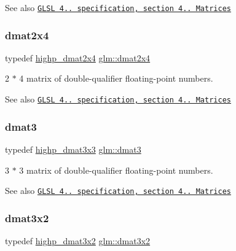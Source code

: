 \begin{DoxySeeAlso}{See also}
\href{http://www.opengl.org/registry/doc/GLSLangSpec.4.20.8.pdf}{\tt G\+L\+SL 4.. specification, section 4.. Matrices} 
\end{DoxySeeAlso}
\mbox{\label{group__core__types_ga2d1dd4b4925d1ea67539902c820483a0}} 
\subsubsection{\texorpdfstring{dmat2x4}{dmat2x4}}
{\footnotesize\ttfamily typedef \mbox{\hyperlink{group__core__precision_gaea7c625705d849f1a55c9bfcb2585875}{highp\+\_\+dmat2x4}} \mbox{\hyperlink{group__core__types_ga2d1dd4b4925d1ea67539902c820483a0}{glm\+::dmat2x4}}}

2 $\ast$ 4 matrix of double-\/qualifier floating-\/point numbers.

\begin{DoxySeeAlso}{See also}
\href{http://www.opengl.org/registry/doc/GLSLangSpec.4.20.8.pdf}{\tt G\+L\+SL 4.. specification, section 4.. Matrices} 
\end{DoxySeeAlso}
\mbox{\label{group__core__types_ga25fd62195c3ef5ac0d32ead1dbfbb929}} 
\subsubsection{\texorpdfstring{dmat3}{dmat3}}
{\footnotesize\ttfamily typedef \mbox{\hyperlink{group__core__precision_gae5f677e4437523476511c84a17206ac2}{highp\+\_\+dmat3x3}} \mbox{\hyperlink{group__core__types_ga25fd62195c3ef5ac0d32ead1dbfbb929}{glm\+::dmat3}}}

3 $\ast$ 3 matrix of double-\/qualifier floating-\/point numbers.

\begin{DoxySeeAlso}{See also}
\href{http://www.opengl.org/registry/doc/GLSLangSpec.4.20.8.pdf}{\tt G\+L\+SL 4.. specification, section 4.. Matrices} 
\end{DoxySeeAlso}
\mbox{\label{group__core__types_ga2db259d2e7921065c5b7d4dca9547960}} 
\subsubsection{\texorpdfstring{dmat3x2}{dmat3x2}}
{\footnotesize\ttfamily typedef \mbox{\hyperlink{group__core__precision_ga8454b92a3917b17a8663f2409cb3100d}{highp\+\_\+dmat3x2}} \mbox{\hyperlink{group__core__types_ga2db259d2e7921065c5b7d4dca9547960}{glm\+::dmat3x2}}}

